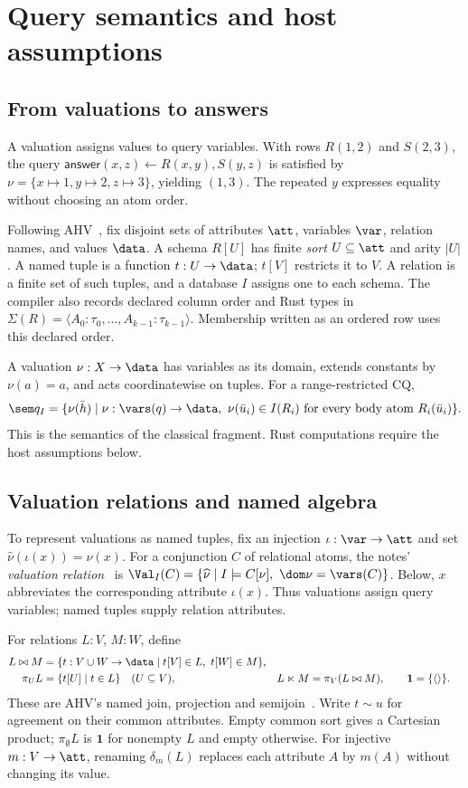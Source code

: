 \section{Query semantics and host assumptions}
\label{sec:scope}
\subsection{From valuations to answers}
\label{sec:valuations}
A valuation assigns values to query variables. With rows $R(1,2)$ and $S(2,3)$,
the query $\mathsf{answer}(x,z)\leftarrow R(x,y),S(y,z)$ is satisfied by
$\nu=\{x\mapsto1,y\mapsto2,z\mapsto3\}$, yielding $(1,3)$.
The repeated $y$ expresses equality without choosing an atom order.

Following AHV~\cite[Sections 3.1--3.3 and 4.2]{ahv}, fix disjoint sets of
attributes $\att$, variables $\var$, relation names, and values $\data$.
A schema $R[U]$ has finite \emph{sort} $U\subseteq\att$ and arity $|U|$.
A named tuple is a function $t:U\to\data$; $t[V]$ restricts it to $V$.
A relation is a finite set of such tuples, and a database $I$ assigns one
to each schema. The compiler also records declared column order and Rust
types in $\Sigma(R)=\langle A_0:\tau_0,\ldots,A_{k-1}:\tau_{k-1}\rangle$.
Membership written as an ordered row uses this declared order.

A valuation $\nu:X\to\data$ has variables as its domain, extends constants
by $\nu(a)=a$, and acts coordinatewise on tuples. For a range-restricted CQ,
\[
 \sem q_I=
 \{\nu(\bar h)\mid \nu:\vars(q)\to\data,\
       \nu(\bar u_i)\in I(R_i)\text{ for every body atom }R_i(\bar u_i)\}.
\]
This is the semantics of the classical fragment. Rust computations require
the host assumptions below.

\subsection{Valuation relations and named algebra}
To represent valuations as named tuples, fix an injection
$\iota:\var\to\att$ and set $\widehat\nu(\iota(x))=\nu(x)$.
For a conjunction $C$ of relational atoms, the notes' \emph{valuation relation}~\cite{notes} is
$\Val_I(C)=\{\widehat\nu\mid I\models C[\nu],\ \dom\nu=\vars(C)\}$.
Below, $x$ abbreviates the corresponding attribute $\iota(x)$.
Thus valuations assign query variables; named tuples supply relation attributes.

For relations $L:V$, $M:W$, define
\[
\begin{aligned}
 L\bowtie M&=\{t:V\cup W\to\data\mid t[V]\in L,\ t[W]\in M\},\\
 \pi_U L&=\{t[U]\mid t\in L\}\quad(U\subseteq V),&
 L\ltimes M&=\pi_V(L\bowtie M),\qquad \mathbf1=\{\langle\rangle\}.
\end{aligned}
\]
These are AHV's named join, projection and semijoin~\cite[Sections 4.4 and 6.4]{ahv}.
Write $t\sim u$ for agreement on their common attributes. Empty common sort
gives a Cartesian product; $\pi_\emptyset L$ is $\mathbf1$ for nonempty $L$
and empty otherwise. For injective $m:V\to\att$, renaming $\delta_m(L)$
replaces each attribute $A$ by $m(A)$ without changing its value.

